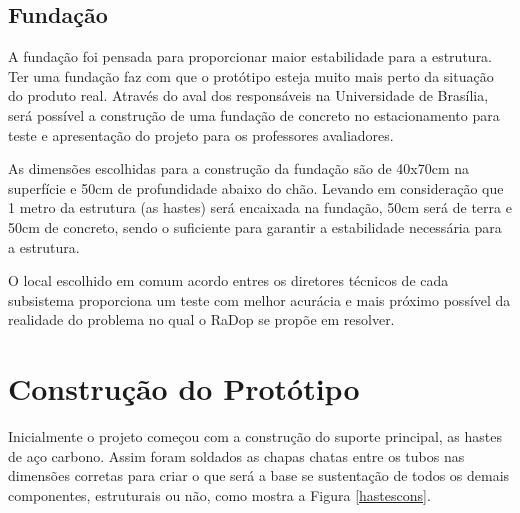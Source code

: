 \subsection{Fundação}

A fundação foi pensada para proporcionar maior estabilidade para a estrutura. Ter uma fundação faz com que o protótipo esteja muito mais perto da situação do produto real. Através do aval dos responsáveis na Universidade de Brasília, será possível a construção de uma fundação de concreto no estacionamento para teste e apresentação do projeto para os professores avaliadores. 

As dimensões escolhidas para a construção da fundação são de 40x70cm na superfície e 50cm de profundidade abaixo do chão. Levando em consideração que 1 metro da estrutura (as hastes) será encaixada na fundação, 50cm será de terra e 50cm de concreto, sendo o suficiente para garantir a estabilidade necessária para a estrutura.

O local escolhido em comum acordo entres os diretores técnicos de cada subsistema proporciona um teste com melhor acurácia e mais próximo possível da realidade do problema no qual o RaDop se propõe em resolver. 

\section{Construção do Protótipo}

Inicialmente o projeto começou com a construção do suporte principal, as hastes de aço carbono. Assim foram soldados as chapas chatas entre os tubos nas dimensões corretas para criar o que será a base se sustentação de todos os demais componentes, estruturais ou não, como mostra a Figura \ref{hastescons}.

